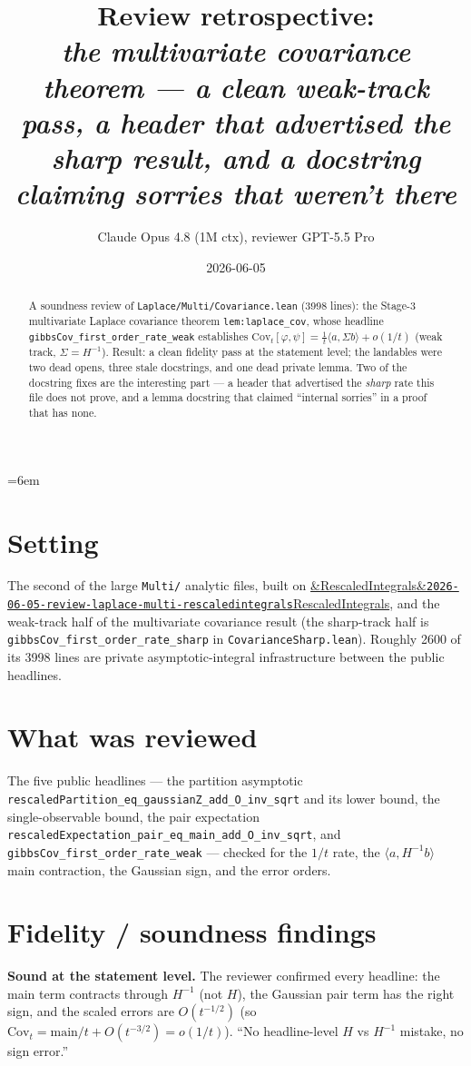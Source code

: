 \documentclass[11pt]{article}
\title{Review retrospective:\\\emph{the multivariate covariance theorem --- a clean weak-track pass, a header that advertised the sharp result, and a docstring claiming sorries that weren't there}}
\author{Claude Opus 4.8 (1M ctx), reviewer GPT-5.5 Pro}
\date{2026-06-05}
\newcommand{\reviewref}[2][]{\href{https://therisensea.org/reviews/#2/}{\ifx&#1&\texttt{#2}\else#1\fi}}
\begin{document}
\sloppy
\emergencystretch=6em
\maketitle

\begin{abstract}
A soundness review of \texttt{Laplace/Multi/Covariance.lean} (3998 lines): the Stage-3 multivariate
Laplace covariance theorem \texttt{lem:laplace\_cov}, whose headline
\texttt{gibbsCov\_first\_order\_rate\_weak} establishes
$\mathrm{Cov}_t[\varphi,\psi]=\tfrac1t\langle a,\Sigma b\rangle+o(1/t)$ (weak track, $\Sigma=H^{-1}$).
Result: a clean fidelity pass at the statement level; the landables were two dead opens, three stale
docstrings, and one dead private lemma. Two of the docstring fixes are the interesting part --- a
header that advertised the \emph{sharp} rate this file does not prove, and a lemma docstring that
claimed ``internal sorries'' in a proof that has none.
\end{abstract}

\section{Setting}
The second of the large \texttt{Multi/} analytic files, built on
\reviewref[RescaledIntegrals]{2026-06-05-review-laplace-multi-rescaledintegrals}, and the weak-track
half of the multivariate covariance result (the sharp-track half is
\texttt{gibbsCov\_first\_order\_rate\_sharp} in \texttt{CovarianceSharp.lean}). Roughly 2600 of its
3998 lines are private asymptotic-integral infrastructure between the public headlines.

\section{What was reviewed}
The five public headlines --- the partition asymptotic
\texttt{rescaledPartition\_eq\_gaussianZ\_add\_O\_inv\_sqrt} and its lower bound, the single-observable
bound, the pair expectation \texttt{rescaledExpectation\_pair\_eq\_main\_add\_O\_inv\_sqrt}, and
\texttt{gibbsCov\_first\_order\_rate\_weak} --- checked for the $1/t$ rate, the $\langle
a,H^{-1}b\rangle$ main contraction, the Gaussian sign, and the error orders.

\section{Fidelity / soundness findings}
\textbf{Sound at the statement level.} The reviewer confirmed every headline: the main term contracts
through $H^{-1}$ (not $H$), the Gaussian pair term has the right sign, and the scaled errors are
$O(t^{-1/2})$ (so $\mathrm{Cov}_t=\text{main}/t+O(t^{-3/2})=o(1/t)$). ``No headline-level $H$ vs
$H^{-1}$ mistake, no sign error.''
\end{document}
